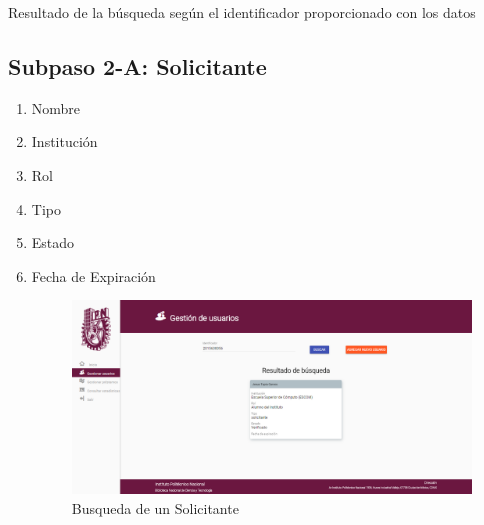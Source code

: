Resultado de la búsqueda según el identificador proporcionado con los datos

\subsection{Subpaso 2-A: Solicitante}
\begin{enumerate}
	\item Nombre
	\item Institución
	\item Rol
	\item Tipo
	\item Estado
	\item Fecha de Expiración
	
		\begin{figure}[hbtp]
		\includegraphics[scale=0.3]
		{images/Interfaz/IUGS22_EncargadoBusquedaSolicitante.png}
		\caption{Busqueda de un Solicitante}
	\end{figure}
\end{enumerate}

